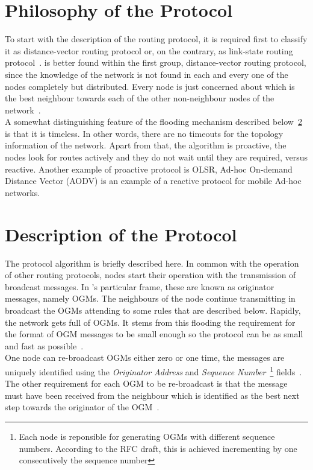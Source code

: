 \documentclass[a4paper]{article}
\begin{document}
\section{Philosophy of the Protocol}

To start with the description of the routing protocol, it is required first to
classify it as distance-vector routing protocol or, on the contrary, as
link-state routing protocol~\cite{applet-DVvsLS}. \batman is better found within
the first group, distance-vector routing protocol, since the knowledge of the
network is not found in each and every one of the nodes completely but
distributed. Every node is just concerned about which is the best neighbour
towards each of the other non-neighbour nodes of the
network~\cite{pdf-batman-status}. \\

\vspace{2mm}
A somewhat distinguishing feature of the flooding mechanism described
below~\ref{sec:protocol-description} is that it is timeless.
In other words, there are no timeouts for the topology information of the
network. Apart from that, the algorithm is proactive, the nodes look for routes
actively and they do not wait until they are required, versus reactive. Another
example of proactive protocol is OLSR, Ad-hoc On-demand Distance Vector (AODV)
is an example of a reactive protocol for mobile Ad-hoc networks.

\section{Description of the Protocol}
\label{sec:protocol-description}

The \batman protocol algorithm is briefly described here. In common with the
operation of other routing protocols, \batman nodes start their operation with
the transmission of broadcast messages. In \batman's particular frame, these
are known as originator messages, namely OGMs. The neighbours of the node
continue transmitting in broadcast the OGMs attending to some rules that are
described below. Rapidly, the network gets full of OGMs. It stems from this
flooding the requirement for the format of OGM messages to be small enough so
the protocol can be as small and fast as possible~\cite{batmanProtocol}.  \\

\vspace{2mm}
One node can re-broadcast OGMs either zero or one time, the messages are
uniquely identified using the \emph{Originator Address} and \emph{Sequence
Number}~\footnote{ Each node is reponsible for generating OGMs with different
sequence numbers. According to the RFC draft, this is achieved incrementing by
one consecutively the sequence number} fields~\cite{batmanRFC}. The other 
requirement for each OGM to be re-broadcast is that the message must have been 
received from the neighbour which is identified as the best next step towards 
the originator of the OGM~\cite{batmanProtocol}. \\
\end{document}
